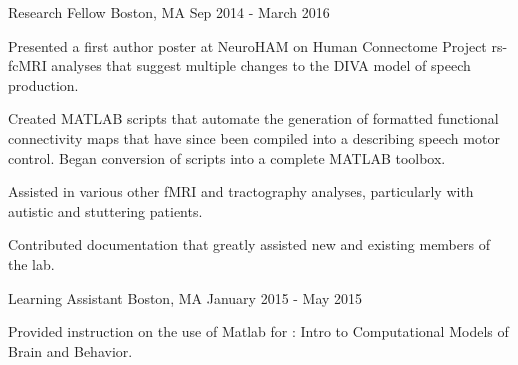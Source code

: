 \begin{cventries}
    {Research Fellow}
    {Boston, MA}
    {Sep 2014 - March 2016}
    {\begin{cvitems}
        \item{Presented a first author 
            {poster} at NeuroHAM on Human Connectome Project rs-fcMRI analyses that
            suggest multiple changes to the DIVA model of speech 
            production.\vspace*{0.1cm}}
        \item{Created MATLAB scripts that automate the generation of formatted
            functional 
            {connectivity maps} that have since been compiled into a  describing speech motor control. Began
            conversion of scripts into a complete 
            {MATLAB toolbox}.\vspace*{0.1cm}}
        \item{Assisted in various other fMRI and tractography analyses, particularly
            with autistic and stuttering patients.\vspace*{0.1cm}}
        \item{Contributed 
            {documentation} that greatly assisted new and existing members of the lab.}
    \end{cvitems}}
    \vspace*{0.2cm}
    
    {Learning Assistant}
    {Boston, MA}
    {January 2015 - May 2015}
    {\begin{cvitems}
        \item{Provided instruction on the use of Matlab for : Intro to Computational Models of
            Brain and Behavior.}
    \end{cvitems}}
    \vspace*{0.2cm}
    

\end{cventries}
